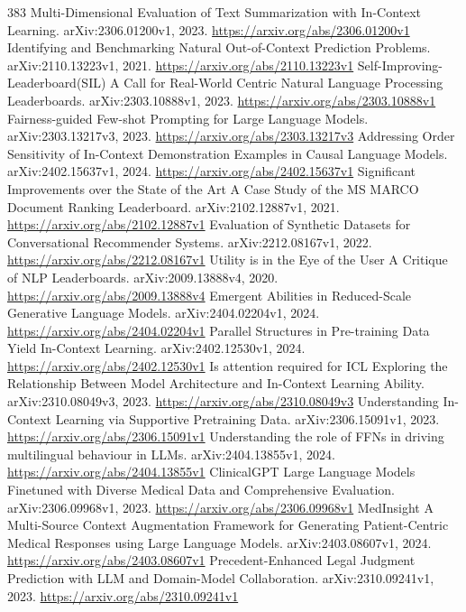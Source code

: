 \documentclass[11pt]{article}
\begin{document}
\begin{thebibliography}{383}
 Multi-Dimensional Evaluation of Text Summarization with In-Context Learning. arXiv:2306.01200v1, 2023. \url{https://arxiv.org/abs/2306.01200v1}
 Identifying and Benchmarking Natural Out-of-Context Prediction Problems. arXiv:2110.13223v1, 2021. \url{https://arxiv.org/abs/2110.13223v1}
 Self-Improving-Leaderboard(SIL) A Call for Real-World Centric Natural Language Processing Leaderboards. arXiv:2303.10888v1, 2023. \url{https://arxiv.org/abs/2303.10888v1}
 Fairness-guided Few-shot Prompting for Large Language Models. arXiv:2303.13217v3, 2023. \url{https://arxiv.org/abs/2303.13217v3}
 Addressing Order Sensitivity of In-Context Demonstration Examples in Causal Language Models. arXiv:2402.15637v1, 2024. \url{https://arxiv.org/abs/2402.15637v1}
 Significant Improvements over the State of the Art A Case Study of the MS MARCO Document Ranking Leaderboard. arXiv:2102.12887v1, 2021. \url{https://arxiv.org/abs/2102.12887v1}
 Evaluation of Synthetic Datasets for Conversational Recommender Systems. arXiv:2212.08167v1, 2022. \url{https://arxiv.org/abs/2212.08167v1}
 Utility is in the Eye of the User A Critique of NLP Leaderboards. arXiv:2009.13888v4, 2020. \url{https://arxiv.org/abs/2009.13888v4}
 Emergent Abilities in Reduced-Scale Generative Language Models. arXiv:2404.02204v1, 2024. \url{https://arxiv.org/abs/2404.02204v1}
 Parallel Structures in Pre-training Data Yield In-Context Learning. arXiv:2402.12530v1, 2024. \url{https://arxiv.org/abs/2402.12530v1}
 Is attention required for ICL Exploring the Relationship Between Model Architecture and In-Context Learning Ability. arXiv:2310.08049v3, 2023. \url{https://arxiv.org/abs/2310.08049v3}
 Understanding In-Context Learning via Supportive Pretraining Data. arXiv:2306.15091v1, 2023. \url{https://arxiv.org/abs/2306.15091v1}
 Understanding the role of FFNs in driving multilingual behaviour in LLMs. arXiv:2404.13855v1, 2024. \url{https://arxiv.org/abs/2404.13855v1}
 ClinicalGPT Large Language Models Finetuned with Diverse Medical Data and Comprehensive Evaluation. arXiv:2306.09968v1, 2023. \url{https://arxiv.org/abs/2306.09968v1}
 MedInsight A Multi-Source Context Augmentation Framework for Generating Patient-Centric Medical Responses using Large Language Models. arXiv:2403.08607v1, 2024. \url{https://arxiv.org/abs/2403.08607v1}
 Precedent-Enhanced Legal Judgment Prediction with LLM and Domain-Model Collaboration. arXiv:2310.09241v1, 2023. \url{https://arxiv.org/abs/2310.09241v1}

\end{thebibliography}
\end{document}
